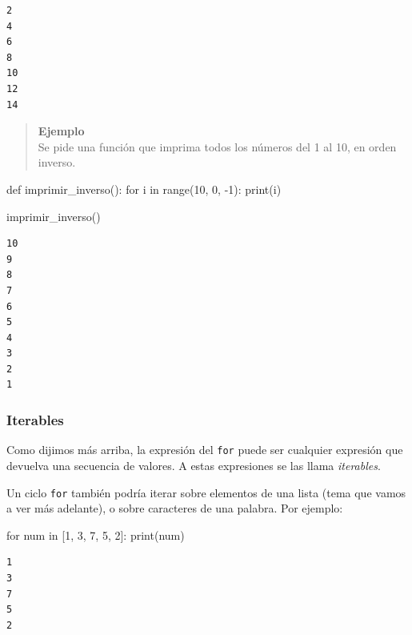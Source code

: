 \documentclass[
  letterpaper,
  DIV=11,
  numbers=noendperiod]{scrreprt}
\newenvironment{Shaded}{\begin{snugshade}}{\end{snugshade}}
\newcommand{\BuiltInTok}[1]{\textcolor[rgb]{0.00,0.23,0.31}{#1}}
\newcommand{\ControlFlowTok}[1]{\textcolor[rgb]{0.00,0.23,0.31}{#1}}
\newcommand{\DecValTok}[1]{\textcolor[rgb]{0.68,0.00,0.00}{#1}}
\newcommand{\KeywordTok}[1]{\textcolor[rgb]{0.00,0.23,0.31}{#1}}
\newcommand{\NormalTok}[1]{\textcolor[rgb]{0.00,0.23,0.31}{#1}}
\newcommand{\OperatorTok}[1]{\textcolor[rgb]{0.37,0.37,0.37}{#1}}
\begin{document}
\begin{verbatim}
2
4
6
8
10
12
14
\end{verbatim}

\hfill\break

\begin{quote}
\textbf{Ejemplo}\\
Se pide una función que imprima todos los números del 1 al 10, en orden
inverso.
\end{quote}

\begin{Shaded}
\begin{Highlighting}[]
\KeywordTok{def}\NormalTok{ imprimir\_inverso():}
  \ControlFlowTok{for}\NormalTok{ i }\KeywordTok{in} \BuiltInTok{range}\NormalTok{(}\DecValTok{10}\NormalTok{, }\DecValTok{0}\NormalTok{, }\OperatorTok{{-}}\DecValTok{1}\NormalTok{):}
      \BuiltInTok{print}\NormalTok{(i)}

\NormalTok{imprimir\_inverso()}
\end{Highlighting}
\end{Shaded}

\begin{verbatim}
10
9
8
7
6
5
4
3
2
1
\end{verbatim}

\hfill\break

\subsubsection{Iterables}\label{iterables}

Como dijimos más arriba, la expresión del \texttt{for} puede ser
cualquier expresión que devuelva una secuencia de valores. A estas
expresiones se las llama \emph{iterables}.

Un ciclo \texttt{for} también podría iterar sobre elementos de una lista
(tema que vamos a ver más adelante), o sobre caracteres de una palabra.
Por ejemplo:

\begin{Shaded}
\begin{Highlighting}[]
\ControlFlowTok{for}\NormalTok{ num }\KeywordTok{in}\NormalTok{ [}\DecValTok{1}\NormalTok{, }\DecValTok{3}\NormalTok{, }\DecValTok{7}\NormalTok{, }\DecValTok{5}\NormalTok{, }\DecValTok{2}\NormalTok{]:}
    \BuiltInTok{print}\NormalTok{(num)}
\end{Highlighting}
\end{Shaded}

\begin{verbatim}
1
3
7
5
2
\end{verbatim}
\end{document}
